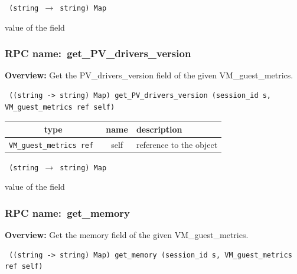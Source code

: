 \vspace{0.3cm}

{\tt 
(string $\rightarrow$ string) Map
}


value of the field
\vspace{0.3cm}
\vspace{0.3cm}
\vspace{0.3cm}
\subsubsection{RPC name:~get\_PV\_drivers\_version}

{\bf Overview:} 
Get the PV\_drivers\_version field of the given VM\_guest\_metrics.

\begin{verbatim} ((string -> string) Map) get_PV_drivers_version (session_id s, VM_guest_metrics ref self)\end{verbatim}



 
\vspace{0.3cm}
\begin{tabular}{|c|c|p{7cm}|}
 \hline
{\bf type} & {\bf name} & {\bf description} \\ \hline
{\tt VM\_guest\_metrics ref } & self & reference to the object \\ \hline 

\end{tabular}

\vspace{0.3cm}

{\tt 
(string $\rightarrow$ string) Map
}


value of the field
\vspace{0.3cm}
\vspace{0.3cm}
\vspace{0.3cm}
\subsubsection{RPC name:~get\_memory}

{\bf Overview:} 
Get the memory field of the given VM\_guest\_metrics.

\begin{verbatim} ((string -> string) Map) get_memory (session_id s, VM_guest_metrics ref self)\end{verbatim}



